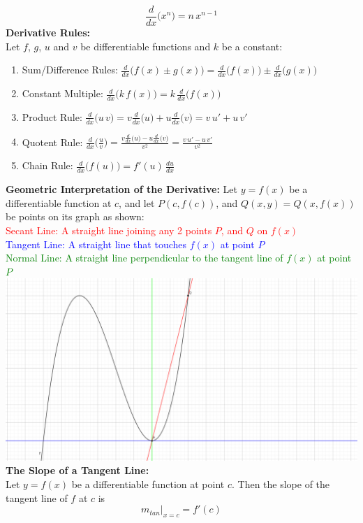\documentclass[14pt]{article}
\begin{document}
    $$\frac{d}{dx}\Big(x^n \Big)=n\,x^{n-1} $$
    \textbf{Derivative Rules:}\\
    Let $f$, $g$, $u$ and $v$ be differentiable functions and $k$ be a constant:
    \begin{enumerate}
        \item Sum/Difference Rules: $\frac{d}{dx}\Big(f(x)\pm g(x)\Big)=\frac{d}{dx}\Big(f(x)\Big)\pm\frac{d}{dx}\Big(g(x)\Big)$
        \item Constant Multiple: $\frac{d}{dx}\Big(k\, f(x)\Big)=k\, \frac{d}{dx}\Big(f(x)\Big)$
        \item Product Rule: $\frac{d}{dx}\Big(u\,v\Big)=v\frac{d}{dx}\Big(u\Big)+u\frac{d}{dx}\Big(v\Big)= v\,u'+u\,v'$
        \item Quotent Rule: $\frac{d}{dx}\Big(\frac{u}{v}\Big)=\frac{v\frac{d}{dx}\big(u\big)-u\frac{d}{dx}\big(v\big)}{v^2}=\frac{v\,u'-u\,v'}{v^2}$
        \item Chain Rule: $\frac{d}{dx}\Big(f(u)\Big)=f'(u)\,\frac{du}{dx}$
    \end{enumerate}
    \textbf{Geometric Interpretation of the Derivative:}
    Let $y=f(x)$ be a differentiable function at $c$, and let $P(c, f(c))$, and $Q(x,y)=Q(x, f(x))$ be points on its graph as shown:\\
    \textcolor{red}{Secant Line: A straight line joining any 2 points $P$, and $Q$ on $f(x)$}\\
    \textcolor{blue}{Tangent Line: A straight line that touches $f(x)$ at point $P$}\\
    \textcolor{green}{Normal Line: A straight line perpendicular to the tangent line of $f(x)$ at point $P$}\\
    \includegraphics[width=\textwidth]{fig1.png}\\
    \textbf{The Slope of a Tangent Line:}\\
    Let $y=f(x)$ be a differentiable function at point $c$. Then the slope of the tangent line of $f$ at $c$ is $$\left. m_{tan}\right|_{x=c}=f'(c)$$
\end{document}

